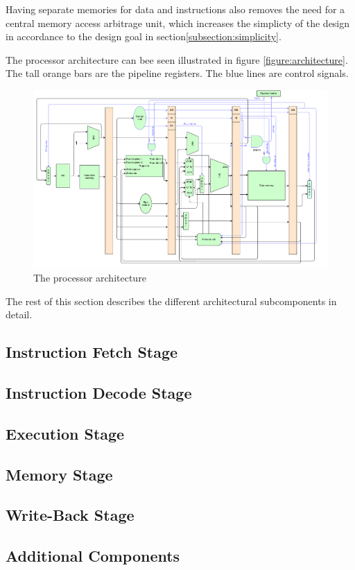 Having separate memories for data and instructions also removes the need for a central memory access arbitrage unit, which increases the simplicty of the design in accordance to the design goal in section\vref{subsection:simplicity}.

The processor architecture can bee seen illustrated in figure \vref{figure:architecture}.
The tall orange bars are the pipeline registers.
The blue lines are control signals.

\begin{figure}[H]
    \includegraphics[width=\textwidth]{illustrations/processor.pdf}
    \caption{The processor architecture}
    \label{figure:architecture}
\end{figure}


The rest of this section describes the different architectural subcomponents in detail.

\subsection{Instruction Fetch Stage}
    

\subsection{Instruction Decode Stage}
    

\subsection{Execution Stage}
    

\subsection{Memory Stage}
    

\subsection{Write-Back Stage}
    

\subsection{Additional Components}
    
